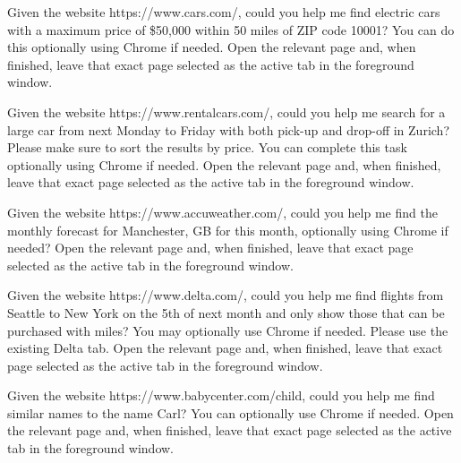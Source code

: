 \documentclass{llmxive}
\begin{document}
\begin{instructionbox}
Given the website \textasciigrave{}https://www.cars.com/\textasciigrave{}, could you help me find electric cars with a maximum price of \$50,000 within 50 miles of ZIP code 10001? You can do this optionally using Chrome if needed. Open the relevant page and, when finished, leave that exact page selected as the active tab in the foreground window.
\end{instructionbox}

\begin{instructionbox}
Given the website \textasciigrave{}https://www.rentalcars.com/\textasciigrave{}, could you help me search for a large car from next Monday to Friday with both pick-up and drop-off in Zurich? Please make sure to sort the results by price. You can complete this task optionally using Chrome if needed. Open the relevant page and, when finished, leave that exact page selected as the active tab in the foreground window.
\end{instructionbox}

\begin{instructionbox}
Given the website \textasciigrave{}https://www.accuweather.com/\textasciigrave{}, could you help me find the monthly forecast for Manchester, GB for this month, optionally using Chrome if needed? Open the relevant page and, when finished, leave that exact page selected as the active tab in the foreground window.
\end{instructionbox}

\begin{instructionbox}
Given the website \textasciigrave{}https://www.delta.com/\textasciigrave{}, could you help me find flights from Seattle to New York on the 5th of next month and only show those that can be purchased with miles? You may optionally use Chrome if needed. Please use the existing Delta tab. Open the relevant page and, when finished, leave that exact page selected as the active tab in the foreground window.
\end{instructionbox}

\begin{instructionbox}
Given the website \textasciigrave{}https://www.babycenter.com/child\textasciigrave{}, could you help me find similar names to the name Carl? You can optionally use Chrome if needed. Open the relevant page and, when finished, leave that exact page selected as the active tab in the foreground window.
\end{instructionbox}
\end{document}
